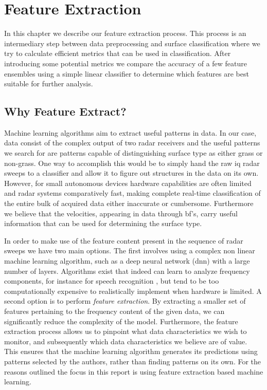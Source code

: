\chapter{Feature Extraction}

In this chapter we describe our feature extraction process. This process is an intermediary step between data preprocessing and surface classification where we try to calculate efficient metrics that can be used in classification. After introducing some potential metrics we compare the accuracy of a few feature ensembles using a simple linear classifier to determine which features are best suitable for further analysis.  

\section{Why Feature Extract?}

Machine learning algorithms aim to  extract useful patterns in data. In our case, data consist of the complex output of two radar receivers and the useful patterns we search for are patterns capable of distinguishing surface type as either grass or non-grass. One way to accomplish this would be to simply hand the raw \gls{iq} radar sweeps to a classifier and allow it to figure out structures in the data on its own. However, for small autonomous devices hardware capabilities are often limited and radar systems comparatively fast, making complete real-time classification of the entire bulk of acquired data either inaccurate or cumbersome. Furthermore we believe that the velocities, appearing in data through \gls{bf}'s, carry useful information that can be used for determining the surface type. 

In order to make use of the feature content present in the sequence of radar sweeps we have two main options. The first involves using a complex non linear machine learning algorithm, such as a deep neural network (\gls{dnn}) with a large number of layers. Algorithms exist that indeed can learn to analyze frequency components, for instance for speech recognition \citep{graves_mohamed_hinton_2013}, but tend to be too computationally expensive to realistically implement when hardware is limited. A second option is to perform \emph{feature extraction}. By extracting a smaller set of features pertaining to the frequency content of the given data, we can significantly reduce the complexity of the model. Furthermore, the feature extraction process allows us to pinpoint what data characteristics we wish to monitor, and subsequently which data characteristics we believe are of value. This ensures that the machine learning algorithm generates its predictions using patterns selected by the authors, rather than finding patterns on its own. For the reasons outlined the focus in this report is using feature extraction based machine learning. 


